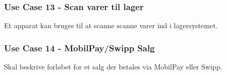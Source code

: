 

\subsubsection*{Use Case 13 - Scan varer til lager}
Et apparat kan bruges til at scanne scanne varer ind i lagersystemet. 

\subsubsection*{Use Case 14 - MobilPay/Swipp Salg}
Skal beskrive forløbet for et salg der betales via MobilPay eller Swipp.